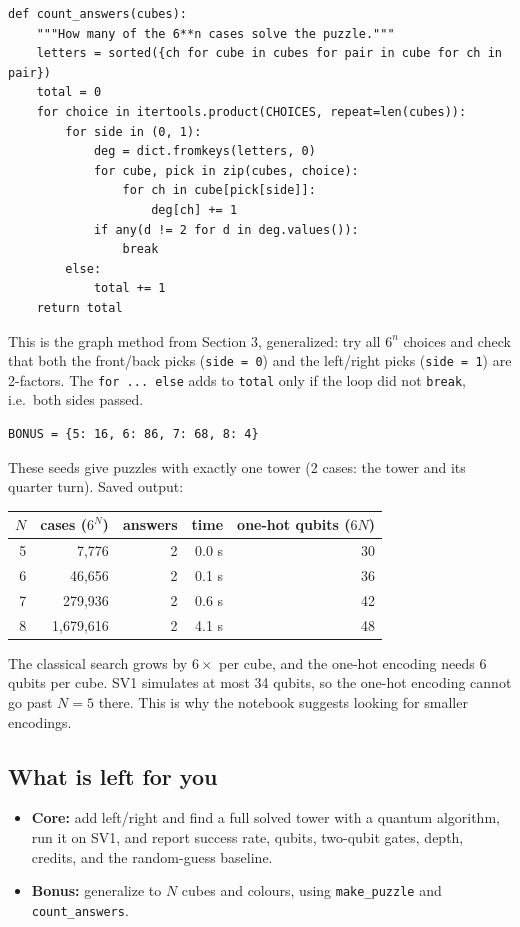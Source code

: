 \documentclass[11pt]{article}
\newcommand{\code}[1]{\texttt{#1}}
\begin{document}
\begin{lstlisting}
def count_answers(cubes):
    """How many of the 6**n cases solve the puzzle."""
    letters = sorted({ch for cube in cubes for pair in cube for ch in pair})
    total = 0
    for choice in itertools.product(CHOICES, repeat=len(cubes)):
        for side in (0, 1):
            deg = dict.fromkeys(letters, 0)
            for cube, pick in zip(cubes, choice):
                for ch in cube[pick[side]]:
                    deg[ch] += 1
            if any(d != 2 for d in deg.values()):
                break
        else:
            total += 1
    return total
\end{lstlisting}

This is the graph method from Section 3, generalized: try all $6^n$ choices
and check that both the front/back picks (\code{side = 0}) and the left/right
picks (\code{side = 1}) are 2-factors. The \code{for ... else} adds to
\code{total} only if the loop did not \code{break}, i.e.\ both sides passed.

\begin{lstlisting}
BONUS = {5: 16, 6: 86, 7: 68, 8: 4}
\end{lstlisting}

These seeds give puzzles with exactly one tower (2 cases: the tower and its
quarter turn). Saved output:

\begin{center}
\begin{tabular}{rrrrr}
\toprule
$N$ & cases ($6^N$) & answers & time & one-hot qubits ($6N$) \\
\midrule
5 & 7,776 & 2 & 0.0 s & 30 \\
6 & 46,656 & 2 & 0.1 s & 36 \\
7 & 279,936 & 2 & 0.6 s & 42 \\
8 & 1,679,616 & 2 & 4.1 s & 48 \\
\bottomrule
\end{tabular}
\end{center}

The classical search grows by $6\times$ per cube, and the one-hot encoding needs
6 qubits per cube. SV1 simulates at most 34 qubits, so the one-hot encoding
cannot go past $N = 5$ there. This is why the notebook suggests looking for
smaller encodings.

\subsection{What is left for you}
\begin{itemize}
  \item \textbf{Core:} add left/right and find a full solved tower with a quantum
        algorithm, run it on SV1, and report success rate, qubits, two-qubit
        gates, depth, credits, and the random-guess baseline.
  \item \textbf{Bonus:} generalize to $N$ cubes and colours, using
        \code{make\_puzzle} and \code{count\_answers}.
\end{itemize}
\end{document}
